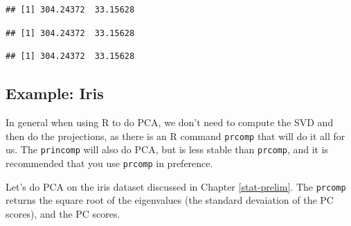\documentclass[]{book}
\newenvironment{Shaded}{\begin{snugshade}}{\end{snugshade}}
\newcommand{\CommentTok}[1]{\textcolor[rgb]{0.56,0.35,0.01}{\textit{#1}}}
\newcommand{\DecValTok}[1]{\textcolor[rgb]{0.00,0.00,0.81}{#1}}
\newcommand{\KeywordTok}[1]{\textcolor[rgb]{0.13,0.29,0.53}{\textbf{#1}}}
\newcommand{\NormalTok}[1]{#1}
\newcommand{\OperatorTok}[1]{\textcolor[rgb]{0.81,0.36,0.00}{\textbf{#1}}}
\newcommand{\StringTok}[1]{\textcolor[rgb]{0.31,0.60,0.02}{#1}}
\theoremstyle{definition}
\theoremstyle{definition}
\theoremstyle{definition}
\theoremstyle{remark}
\begin{document}
\begin{verbatim}
## [1] 304.24372  33.15628
\end{verbatim}

\begin{Shaded}
\end{Shaded}

\begin{verbatim}
## [1] 304.24372  33.15628
\end{verbatim}

\begin{Shaded}
\end{Shaded}

\begin{verbatim}
## [1] 304.24372  33.15628
\end{verbatim}

\hypertarget{example-iris}{%
\subsection{Example: Iris}\label{example-iris}}

In general when using R to do PCA, we don't need to compute the SVD and then do the projections, as there is an R command \texttt{prcomp} that will do it all for us. The \texttt{princomp} will also do PCA, but is less stable than \texttt{prcomp}, and it is recommended that you use \texttt{prcomp} in preference.

Let's do PCA on the iris dataset discussed in Chapter \ref{stat-prelim}. The \texttt{prcomp} returns the square root of the eigenvalues (the standard devaiation of the PC scores), and the PC scores.

\begin{Shaded}
\end{Shaded}
\end{document}

